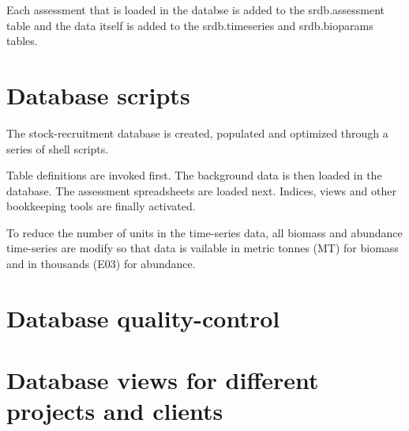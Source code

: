 \documentclass[letterpaper,12pt]{article}
\begin{document}
Each assessment that is loaded in the databse is added to the srdb.assessment table and the data itself is added to the srdb.timeseries and srdb.bioparams tables.


\section{Database scripts}


The stock-recruitment database is created, populated and optimized through a series of shell scripts. 

Table definitions are invoked first. The background data is then loaded in the database. The assessment spreadsheets are loaded next. Indices, views and other bookkeeping tools are finally activated.


To reduce the number of units in the time-series data, all biomass and abundance time-series are modify so that data is vailable in metric tonnes (MT) for biomass and in thousands (E03) for abundance. 


\section{Database quality-control}



\section{Database views for different projects and clients}
\end{document}

